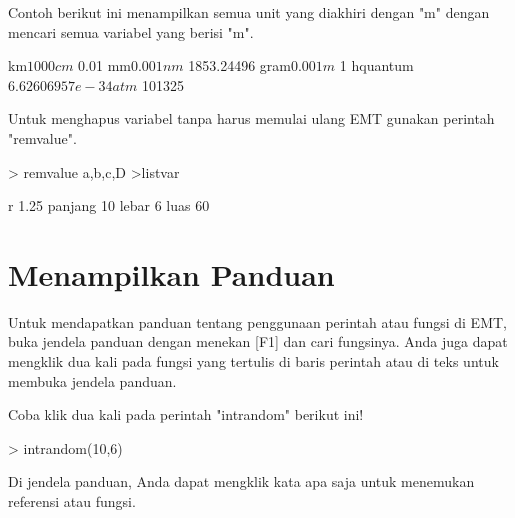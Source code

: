 \documentclass{article}
\newenvironment{eulernotebook}{\par}{\par}
\newcommand{\eulerheading}[1]{\section{#1}}
\newenvironment{eulercomment}{\par\medskip}{\par\medskip}
\begin{document}
\begin{eulernotebook}
\begin{eulercomment}
Contoh berikut ini menampilkan semua unit yang diakhiri dengan "m"
dengan mencari semua variabel yang berisi "m\textdollar{}".
\end{eulercomment}
\begin{euleroutput}
  km$                 1000
  cm$                 0.01
  mm$                 0.001
  nm$                 1853.24496
  gram$               0.001
  m$                  1
  hquantum$           6.62606957e-34
  atm$                101325
\end{euleroutput}
\begin{eulercomment}
Untuk menghapus variabel tanpa harus memulai ulang EMT gunakan
perintah "remvalue".
\end{eulercomment}
\begin{eulerprompt}
> remvalue a,b,c,D
>listvar 
\end{eulerprompt}
\begin{euleroutput}
  r                   1.25
  panjang             10
  lebar               6
  luas                60
\end{euleroutput}
\eulerheading{Menampilkan Panduan}
\begin{eulercomment}
Untuk mendapatkan panduan tentang penggunaan perintah atau fungsi di EMT, buka
jendela panduan dengan menekan [F1] dan cari fungsinya. Anda juga dapat
mengklik dua kali pada fungsi yang tertulis di baris perintah atau di teks
untuk membuka jendela panduan.

Coba klik dua kali pada perintah "intrandom" berikut ini!
\end{eulercomment}
\begin{eulerprompt}
> intrandom(10,6)
\end{eulerprompt}
\begin{euleroutput}
  [4,  2,  6,  2,  4,  2,  3,  2,  2,  6]
\end{euleroutput}
\begin{eulercomment}
Di jendela panduan, Anda dapat mengklik kata apa saja untuk menemukan
referensi atau fungsi.


\end{eulercomment}
\end{eulernotebook}
\end{document}
